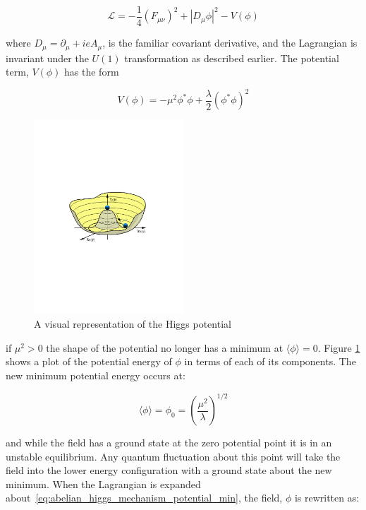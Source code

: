 \begin{equation}\label{eq:abelian_higgs_mechanism_lagrangian}
\mathcal{L} = -\frac{1}{4}(F_{\mu\nu})^{2} + |D_{\mu}\phi|^{2} -
V(\phi)
\end{equation}

\noindent where $D_{\mu} = \partial_{\mu} + ieA_{\mu}$, is the familiar
covariant derivative, and the Lagrangian is invariant under the $U(1)$
transformation as described earlier.  The potential term, $V(\phi)$
has the form

\begin{equation}\label{eq:abelian_higgs_mechanism_potential}
V(\phi) = -\mu^{2}\phi^{\ast}\phi +
\frac{\lambda}{2}(\phi^{\ast}\phi)^{2}
\end{equation}

\begin{figure}[h]
   \centering
  \includegraphics[width=0.5\textwidth]{Figures/Basic_Diagrams/higgs-potential.pdf}
  \caption{A visual representation of the Higgs potential \cite{th:HiggsPotential}} \label{fig:higgs_potential}
\end{figure}

\noindent if $\mu^{2}>0$ the shape of the potential no longer has a
minimum at $\langle\phi\rangle = 0$.  Figure \ref{fig:higgs_potential}
shows a plot of the potential energy of $\phi$ in terms of each of its
components.  The new minimum potential energy
occurs at:

\begin{equation}\label{eq:abelian_higgs_mechanism_potential_min}
\langle\phi\rangle = \phi_{0} = \left(\frac{\mu^{2}}{\lambda}\right)^{1/2}
\end{equation}

\noindent and while the field has a ground state at the zero potential
point it is in an unstable equilibrium.  Any quantum fluctuation about
this point will take the field into the lower energy configuration
with a ground state about the new minimum.  When the Lagrangian is
expanded about~\ref{eq:abelian_higgs_mechanism_potential_min}, the
field, $\phi$ is rewritten as: 

